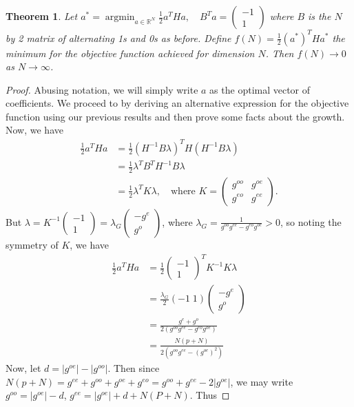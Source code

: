 \documentclass{article}
\newtheorem{thm}{Theorem}[section]
\theoremstyle{definition}
\theoremstyle{remark}
\numberwithin{equation}{section}
\DeclareMathOperator{\argmin}{argmin}
\begin{document}
\begin{thm}
Let $a^* = \argmin_{a\in\mathbb{R}^N} \frac{1}{2} a^T H a, \quad B^Ta = \begin{pmatrix} -1 \\ 1 \end{pmatrix}$ where $B$ is the $N$ by 2 matrix of alternating 1s and 0s as before. Define $f(N) = \frac{1}{2}(a^*)^T H a^*$ the minimum for the objective function achieved for dimension $N$. Then $f(N) \to 0$ as $N\to \infty$.
\end{thm}
\begin{proof}
Abusing notation, we will simply write $a$ as the optimal vector of coefficients. We proceed to by deriving an alternative expression for the objective function using our previous results and then prove some facts about the growth. Now, we have
\begin{align*}
\frac{1}{2}a^T Ha &= \frac{1}{2}(H^{-1}B \lambda)^TH(H^{-1}B \lambda) \\
&= \frac{1}{2} \lambda^T B^T H^{-1}B \lambda \\
&= \frac{1}{2} \lambda^T K\lambda, \quad \text{where } K= \begin{pmatrix} g^{oo} & g^{oe} \\
g^{eo} & g^{ee} \end{pmatrix}.
\end{align*} But $\lambda = K^{-1} \begin{pmatrix} -1 \\ 1 \end{pmatrix} = \lambda_G \begin{pmatrix} -g^e \\ g^o \end{pmatrix}$, where $\lambda_G = \frac{1}{g^{oo} g^{ee} - g^{eo}g^{oe}} >0$, so noting the symmetry of $K$, we have 
\begin{align*}
\frac{1}{2} a^T Ha &= \frac{1}{2}\begin{pmatrix} -1 \\ 1\end{pmatrix} ^T K^{-1} K \lambda \\ 
&= \frac{\lambda_G}{2}(-1 \; 1) \begin{pmatrix} -g^e \\ g^o \end{pmatrix}\\
&= \frac{g^e + g^o}{2(g^{oo} g^{ee} - g^{eo}g^{oe})}\\
&= \frac{N(p+N)}{2(g^{oo}g^{ee} - (g^{oe})^2)}
\end{align*}
Now, let $d=|g^{oe}| - |g^{oo}|$. Then since $N(p+N) = g^{ee} + g^{oo} + g^{oe} + g^{eo} = g^{oo}+g^{ee} - 2|g^{oe}|$, we may write $g^{oo} = |g^{oe}|-d$, $g^{ee} = |g^{oe}| + d + N(P+N)$. Thus 

\end{proof}
\end{document}
